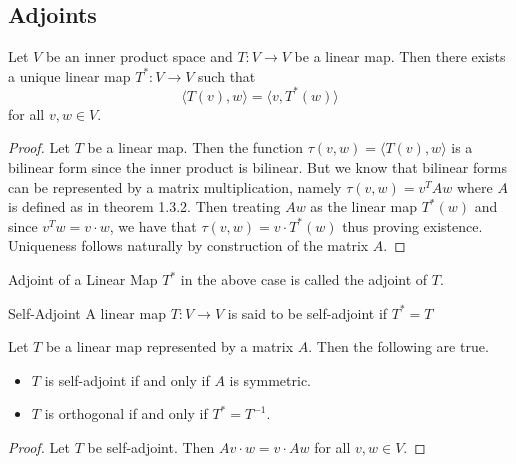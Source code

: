 \documentclass[a4paper]{article}
\begin{document}
\subsection{Adjoints}
\begin{prp}{}{} Let $V$ be an inner product space and $T:V\to V$ be a linear map. Then there exists a unique linear map $T^\ast:V\to V$ such that $$\langle T(v), w\rangle=\langle v, T^\ast(w)\rangle$$ for all $v,w\in V$. \tcbline
\begin{proof}
Let $T$ be a linear map. Then the function $\tau(v,w)=\langle T(v), w\rangle$ is a bilinear form since the inner product is bilinear. But we know that bilinear forms can be represented by a matrix multiplication, namely $\tau(v,w)=v^TAw$ where $A$ is defined as in theorem 1.3.2. Then treating $Aw$ as the linear map $T^\ast(w)$ and since $v^Tw=v\cdot w$, we have that $\tau(v,w)=v\cdot T^\ast(w)$ thus proving existence. Uniqueness follows naturally by construction of the matrix $A$. 
\end{proof}
\end{prp}

\begin{defn}{Adjoint of a Linear Map}{} $T^\ast$ in the above case is called the adjoint of $T$. 
\end{defn}

\begin{defn}{Self-Adjoint}{} A linear map $T:V\to V$ is said to be self-adjoint if $T^*=T$
\end{defn}

\begin{prp}{}{} Let $T$ be a linear map represented by a matrix $A$. Then the following are true. 
\begin{itemize}
\item $T$ is self-adjoint if and only if $A$ is symmetric. 
\item $T$ is orthogonal if and only if $T^\ast=T^{-1}$. 
\end{itemize}
\tcbline
\begin{proof}
Let $T$ be self-adjoint. Then $Av\cdot w=v\cdot Aw$ for all $v,w\in V$. 
\end{proof}
\end{prp}
\end{document}
